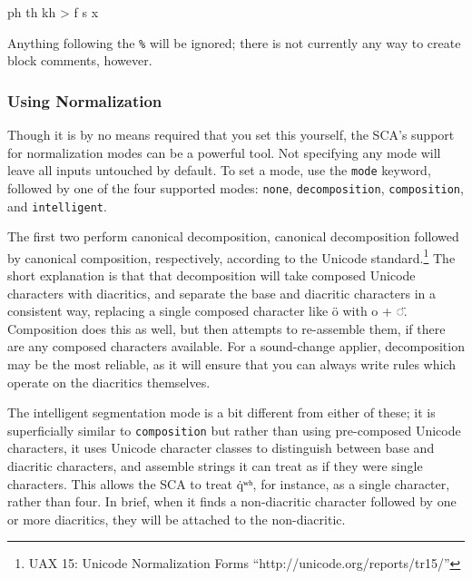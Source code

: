 \documentclass[10pt,letterpaper]{article}
\newcommand\textIPA[1]{{\fontIPA #1}}
\newcounter{excounter}
\newenvironment{vex}[1]{
  \vspace{1em}
  \refstepcounter{excounter}
  \noindent\makebox[3em][l]{(\arabic{excounter}\label{#1})}
  \minipage{\textwidth}
  \verbatim
}{
  \endverbatim
  \endminipage
  \vspace{1em}
}
\begin{document}
\begin{vex}{ex:comment}
ph th kh > f s x %
\end{vex}

\noindent
Anything following the \texttt{\%} will be ignored; there is not currently any way to create block comments, however. 


\subsubsection{Using Normalization} 
\label{ssub:using_normalization}
Though it is by no means required that you set this yourself, the SCA's support for normalization modes can be a powerful tool. Not specifying any mode will leave all inputs untouched by default. To set a mode, use the \texttt{mode} keyword, followed by one of the four supported modes: \texttt{none}, \texttt{decomposition}, \texttt{composition}, and \texttt{intelligent}.

The first two perform canonical decomposition, canonical decomposition followed by canonical composition, respectively, according to the Unicode standard.\footnote{UAX 15: Unicode Normalization Forms ``http://unicode.org/reports/tr15/''} The short explanation is that that decomposition will take composed Unicode characters with diacritics, and separate the base and diacritic characters in a consistent way, replacing a single composed character like ö with o + ◌̈. Composition does this as well, but then attempts to re-assemble them, if there are any composed characters available. For a sound-change applier, decomposition may be the most reliable, as it will ensure that you can always write rules which operate on the diacritics themselves.


The intelligent segmentation mode is a bit different from either of these; it is superficially similar to \texttt{composition} but rather than using pre-composed Unicode characters, it uses Unicode character classes to distinguish between base and diacritic characters, and assemble strings it can treat as if they were single characters. This allows the SCA to treat \textIPA{q̇ʷʰ}, for instance, as a single character, rather than four. In brief, when it finds a non-diacritic character followed by one or more diacritics, they will be attached to the non-diacritic.
\end{document}
